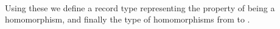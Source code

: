 \begin{code}
\AgdaSpace{}%
\AgdaSymbol{(}\AgdaSpace{}%
\AgdaSpace{}%
\AgdaSymbol{)}\<%
\\
%
\>[1]\AgdaSpace{}%
\AgdaSymbol{:}\AgdaSpace{}%
\AgdaSymbol{(}\AgdaOperator{\AgdaFunction{𝔻[}}\AgdaSpace{}%
\AgdaSpace{}%
\AgdaOperator{\AgdaFunction{]}}\AgdaSpace{}%
\AgdaSpace{}%
\AgdaOperator{\AgdaFunction{𝔻[}}\AgdaSpace{}%
\AgdaSpace{}%
\AgdaOperator{\AgdaFunction{]}}\AgdaSymbol{)}\AgdaSpace{}%
\AgdaSpace{}%
\AgdaSpace{}%
\AgdaSymbol{\AgdaUnderscore{}}\<%
\\
%
\>[1]\AgdaSpace{}%
\AgdaSpace{}%
\AgdaSymbol{=}\AgdaSpace{}%
\AgdaSpace{}%
\AgdaSymbol{\{}\AgdaSymbol{\}}\AgdaSpace{}%
\AgdaSpace{}%
\AgdaSpace{}%
\AgdaSpace{}%
\<%
\\
\>[0]\<%
\end{code}
Using these we define a record type  representing the property of being
a homomorphism, and finally the type  of homomorphisms from  to .

